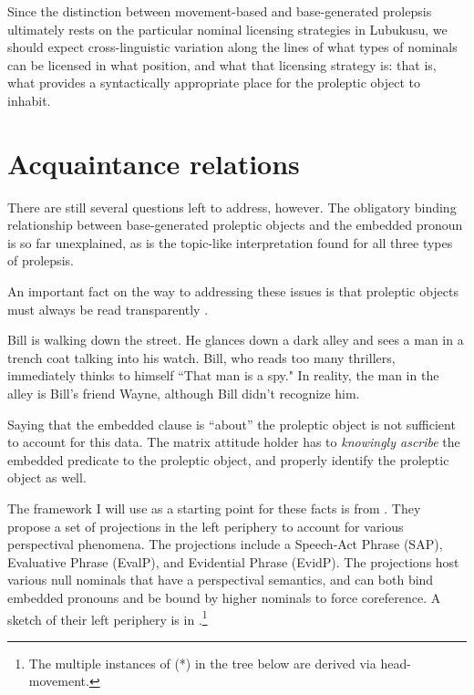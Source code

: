 \documentclass[output=paper,colorlinks,citecolor=brown]{langscibook}
\begin{document}
Since the distinction between movement-based and base-generated prolepsis ultimately rests on the particular nominal licensing strategies in Lubukusu, we should expect cross-linguistic variation along the lines of what types of nominals can be licensed in what position, and what that licensing strategy is: that is, what provides a syntactically appropriate place for the proleptic object to inhabit.

\section{Acquaintance relations}\label{sec:newkirk:4}

There are still several questions left to address, however. The obligatory binding relationship between base-generated proleptic objects and the embedded pronoun is so far unexplained, as is the topic-like interpretation found for all three types of prolepsis.

An important fact on the way to addressing these issues is that proleptic objects must always be read transparently \citep{Salzmann2006,Salzmann2017Chapter}.

\ea%
    \label{ex:newkirk:37} \begin{context}
    Bill is walking down the street. He glances down a dark alley and sees a man in a trench coat talking into his watch. Bill, who reads too many thrillers, immediately thinks to himself ``That man is a spy." In reality, the man in the alley is Bill's friend Wayne, although Bill didn't recognize him.
    \end{context}
	\z
\z

Saying that the embedded clause is ``about'' the proleptic object is not sufficient to account for this data. The matrix attitude holder has to \emph{knowingly ascribe} the embedded predicate to the proleptic object, and properly identify the proleptic object as well.

The framework I will use as a starting point for these facts is from \citet{SpeasTenny2003}. They propose a set of projections in the left periphery to account for various perspectival phenomena. The projections include a Speech-Act Phrase (SAP), Evaluative Phrase (EvalP), and Evidential Phrase (EvidP). The projections host various null nominals that have a perspectival semantics, and can both bind embedded pronouns and be bound by higher nominals to force coreference. A sketch of their left periphery is in .\footnote{The multiple instances of (\**) in the tree below are derived via head-movement.}
\end{document}
